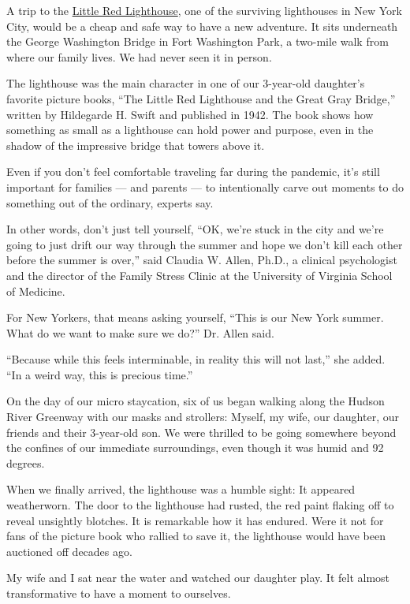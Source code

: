 A trip to the
\href{https://www.nycgovparks.org/parks/fort-washington-park/highlights/11044}{Little
Red Lighthouse}, one of the surviving lighthouses in New York City,
would be a cheap and safe way to have a new adventure. It sits
underneath the George Washington Bridge in Fort Washington Park, a
two-mile walk from where our family lives. We had never seen it in
person.

The lighthouse was the main character in one of our 3-year-old
daughter's favorite picture books, ``The Little Red Lighthouse and the
Great Gray Bridge,'' written by Hildegarde H. Swift and published in
1942. The book shows how something as small as a lighthouse can hold
power and purpose, even in the shadow of the impressive bridge that
towers above it.

Even if you don't feel comfortable traveling far during the pandemic,
it's still important for families --- and parents --- to intentionally
carve out moments to do something out of the ordinary, experts say.

In other words, don't just tell yourself, ``OK, we're stuck in the city
and we're going to just drift our way through the summer and hope we
don't kill each other before the summer is over,'' said Claudia W.
Allen, Ph.D., a clinical psychologist and the director of the Family
Stress Clinic at the University of Virginia School of Medicine.

For New Yorkers, that means asking yourself, ``This is our New York
summer. What do we want to make sure we do?'' Dr. Allen said.

``Because while this feels interminable, in reality this will not
last,'' she added. ``In a weird way, this is precious time.''

On the day of our micro staycation, six of us began walking along the
Hudson River Greenway with our masks and strollers: Myself, my wife, our
daughter, our friends and their 3-year-old son. We were thrilled to be
going somewhere beyond the confines of our immediate surroundings, even
though it was humid and 92 degrees.

When we finally arrived, the lighthouse was a humble sight: It appeared
weatherworn. The door to the lighthouse had rusted, the red paint
flaking off to reveal unsightly blotches. It is remarkable how it has
endured. Were it not for fans of the picture book who rallied to save
it, the lighthouse would have been auctioned off decades ago.

My wife and I sat near the water and watched our daughter play. It felt
almost transformative to have a moment to ourselves.

